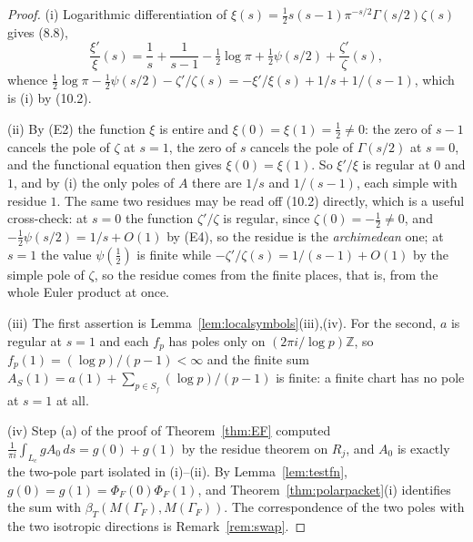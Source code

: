 \documentclass[11pt]{amsart}
\theoremstyle{definition}
\theoremstyle{remark}
\newcommand{\Z}{\mathbb Z}
\begin{document}
\begin{proof}
(i)  Logarithmic differentiation of
$\xi(s)=\tfrac12s(s-1)\pi^{-s/2}\Gamma(s/2)\zeta(s)$ gives (8.8),
\[
  \frac{\xi'}{\xi}(s)=\frac1s+\frac1{s-1}-\tfrac12\log\pi+\tfrac12\psi(s/2)
  +\frac{\zeta'}{\zeta}(s),
\]
whence
$\tfrac12\log\pi-\tfrac12\psi(s/2)-\zeta'/\zeta(s)
=-\xi'/\xi(s)+1/s+1/(s-1)$, which is (i) by (10.2).

(ii)  By (E2) the function $\xi$ is entire and $\xi(0)=\xi(1)=\tfrac12\ne0$:
the zero of $s-1$ cancels the pole of $\zeta$ at $s=1$, the zero of $s$ cancels
the pole of $\Gamma(s/2)$ at $s=0$, and the functional equation then gives
$\xi(0)=\xi(1)$.  So $\xi'/\xi$ is regular at $0$ and $1$, and by (i) the only
poles of $A$ there are $1/s$ and $1/(s-1)$, each simple with residue $1$.  The
same two residues may be read off (10.2) directly, which is a useful
cross-check: at $s=0$ the function $\zeta'/\zeta$ is regular, since
$\zeta(0)=-\tfrac12\ne0$, and $-\tfrac12\psi(s/2)=1/s+O(1)$ by (E4), so the
residue is the \emph{archimedean} one; at $s=1$ the value $\psi(\tfrac12)$ is
finite while $-\zeta'/\zeta(s)=1/(s-1)+O(1)$ by the simple pole of $\zeta$, so
the residue comes from the finite places, that is, from the whole Euler
product at once.

(iii)  The first assertion is Lemma~\ref{lem:localsymbols}(iii),(iv).  For the
second, $a$ is regular at $s=1$ and each $f_p$ has poles only on
$(2\pi i/\log p)\Z$, so $f_p(1)=(\log p)/(p-1)<\infty$ and the finite sum
$A_S(1)=a(1)+\sum_{p\in S_f}(\log p)/(p-1)$ is finite: a finite chart has no
pole at $s=1$ at all.

(iv)  Step (a) of the proof of Theorem~\ref{thm:EF} computed
$\frac1{\pi i}\int_{L_c}gA_0\,ds=g(0)+g(1)$ by the residue theorem on $R_j$,
and $A_0$ is exactly the two-pole part isolated in (i)--(ii).  By
Lemma~\ref{lem:testfn}, $g(0)=g(1)=\Phi_F(0)\Phi_F(1)$, and
Theorem~\ref{thm:polarpacket}(i) identifies the sum with
$\beta_T(M(\Gamma_F),M(\Gamma_F))$.  The correspondence of the two poles with
the two isotropic directions is Remark~\ref{rem:swap}.
\end{proof}
\end{document}

